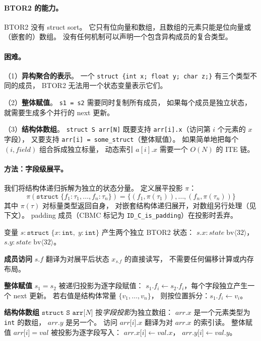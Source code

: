 \documentclass[11pt,a4paper]{article}
\begin{document}
\paragraph{BTOR2 的能力。}
BTOR2 没有 struct sort。
它只有位向量和数组，且数组的元素只能是位向量或（嵌套的）数组。
没有任何机制可以声明一个包含异构成员的复合类型。

\paragraph{困难。}
（1）\textbf{异构聚合的表示}。
一个 \texttt{struct \{int x; float y; char z;\}} 有三个类型不同的成员，
BTOR2 无法用一个状态变量表示它们。

（2）\textbf{整体赋值}。
\texttt{s1 = s2} 需要同时复制所有成员，
如果每个成员是独立状态，就需要生成多个并行的 next 更新。

（3）\textbf{结构体数组}。
\texttt{struct S arr[N]} 既要支持 \texttt{arr[i].x}（访问第 $i$ 个元素的 $x$ 字段），
又要支持 \texttt{arr[i] = some\_struct}（整体赋值）。
如果简单地把每个 $(i, \mathit{field})$ 组合拆成独立标量，
动态索引 $a[i].x$ 需要一个 $O(N)$ 的 ITE 链。

\paragraph{方法：字段级展平。}
我们将结构体递归拆解为独立的状态分量。
定义展平投影 $\pi$：
\[
\pi(\texttt{struct}\;\{f_1{:}\tau_1, \ldots, f_n{:}\tau_n\})
= \{(f_1, \pi(\tau_1)), \ldots, (f_n, \pi(\tau_n))\}
\]
其中 $\pi(\tau)$ 对标量类型返回自身，
对嵌套结构体递归展开，对数组另行处理（见下文）。
padding 成员（CBMC 标记为 \texttt{ID\_C\_is\_padding}）在投影时丢弃。

变量 $s : \texttt{struct}\;\{x{:}\texttt{int},\;y{:}\texttt{int}\}$
产生两个独立 BTOR2 状态：
$s.x : \mathit{state}\;\mathrm{bv}\langle 32 \rangle$，
$s.y : \mathit{state}\;\mathrm{bv}\langle 32 \rangle$。

\textbf{成员访问} $s.f$ 翻译为对展平后状态 $x_{s.f}$ 的直接读写，
不需要任何偏移计算或内存布局。

\textbf{整体赋值} $s_1 = s_2$ 被递归投影为逐字段赋值：
$s_1.f_i \leftarrow s_2.f_i$，每个字段独立产生一个 next 更新。
若右值是结构体常量 $\{v_1, \ldots, v_n\}$，
则按位置拆分：$s_1.f_i \leftarrow v_i$。

\textbf{结构体数组} $\texttt{struct S arr[}N\texttt{]}$
按\emph{字段投影}为独立数组：
$\mathit{arr.x}$ 是一个元素类型为 \texttt{int} 的数组，
$\mathit{arr.y}$ 是另一个。
访问 $\mathit{arr[}i\mathit{]}.x$ 翻译为对 $\mathit{arr.x}$ 的索引读。
整体赋值 $\mathit{arr[}i\mathit{]} = \mathit{val}$
被投影为逐字段写入：
$\mathit{arr.x[}i\mathit{]} \leftarrow \mathit{val.x}$，
$\mathit{arr.y[}i\mathit{]} \leftarrow \mathit{val.y}$。
\end{document}
